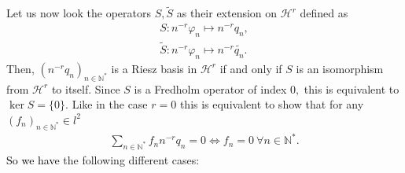 \documentclass[11pt, dvipsnames]{amsart}
\begin{document}
Let us now look the operators $S, \tilde S$ as their extension on $\mathcal{H}^r$ defined as
\begin{align*}
    S: n^{-r}\varphi_n\mapsto n^{-r}q_n,\\
    \tilde S: n^{-r}\varphi_n\mapsto n^{-r}\widetilde{q_n}.
\end{align*} Then, $(n^{-r}q_n)_{n\in\mathbb{N}^*}$ is a Riesz basis in $\mathcal{H}^r$ if and only if $S$ is an isomorphism from $\mathcal{H}^r$ to itself. Since $S$ is a Fredholm operator of index $0,$ this is equivalent to $\ker S=\{0\}$. Like in the case $r=0$ this is equivalent to show that for any $(f_n)_{n\in \mathbb{N}^*}\in l^2$
\begin{align}
   \sum_{n\in \mathbb{N}^*}f_n n^{-r}q_n=0 \Leftrightarrow f_n=0\ \forall n\in \mathbb{N}^*.\label{w_indepen_negatif}
\end{align} 
\textcolor{black}{So we have} the following different cases:
\end{document}
